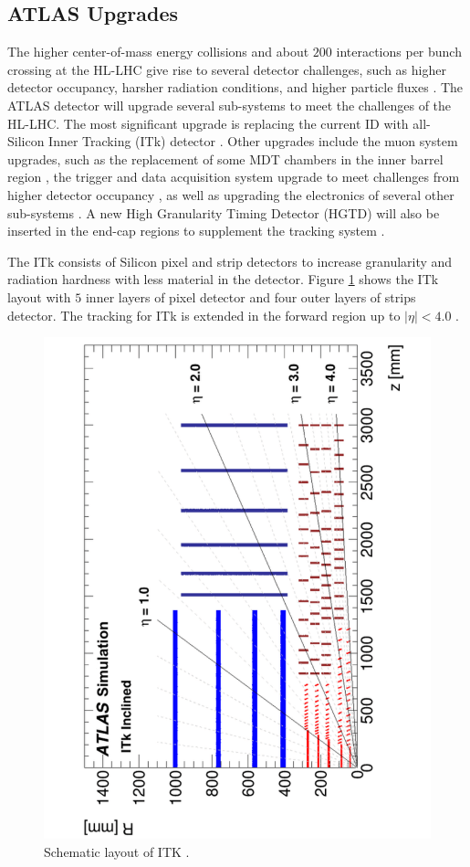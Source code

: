 \subsection{ATLAS Upgrades}
\label{subsec:ATLASUpgrade}
The higher center-of-mass energy collisions and about $200$ interactions per bunch crossing at the HL-LHC give rise to several detector challenges, such as higher detector occupancy, harsher radiation conditions, and higher particle fluxes \cite{HLLHC}. The ATLAS detector will upgrade several sub-systems to meet the challenges of the HL-LHC. The most significant upgrade is replacing the current ID with all-Silicon Inner Tracking (ITk) detector \cite{HLLHC}. Other upgrades include the muon system upgrades, such as the replacement of some MDT chambers in the inner barrel region \cite{HLLHCMuon}, the trigger and data acquisition system upgrade to meet challenges from higher detector occupancy \cite{HLLHCTrigger}, as well as upgrading the electronics of several other sub-systems \cite{HLLHC}. A new High Granularity Timing Detector (HGTD) will also be inserted in the end-cap regions to supplement the tracking system \cite{HLLHC}.

The ITk consists of Silicon pixel and strip detectors to increase granularity and radiation hardness with less material in the detector. Figure \ref{fig:ITKLayout} shows the ITk layout with $5$ inner layers of pixel detector and four outer layers of strips detector. The tracking for ITk is extended in the forward region up to $|\eta| < 4.0$ \cite{ITkStripsTDR}. 

\begin{figure}[!htbp]
    \centering
    \includegraphics[angle=270,width=.7\linewidth]{figures/LHC/ITKLayout.pdf}
    \caption{ Schematic layout of ITK \cite{ITkPixelTDR}.\label{fig:ITKLayout}}
\end{figure}

